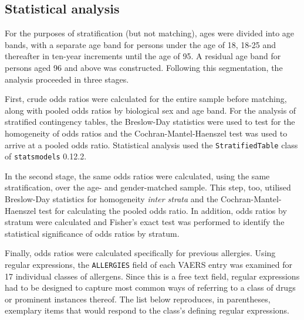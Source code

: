 \documentclass{article}
\begin{document}
\subsection{Statistical analysis}

For the purposes of stratification (but not matching), ages were divided into age bands, with a separate age band for persons under the age of 18, 18-25 and thereafter in ten-year increments until the age of 95.
A residual age band for persons aged 96 and above was constructed. Following this segmentation, the analysis proceeded in three stages.

First, crude odds ratios were calculated for the entire sample before matching, along with pooled odds ratios by biological sex and age band.
For the analysis of stratified contingency tables, the Breslow-Day statistics were used to test for the homogeneity of odds ratios and the Cochran-Mantel-Haenszel test was used to arrive at a pooled odds ratio.
Statistical analysis used the \texttt{StratifiedTable} class of \texttt{statsmodels} 0.12.2.\cite{seabold2010statsmodels}

In the second stage, the same odds ratios were calculated, using the same stratification, over the age- and gender-matched sample.
This step, too, utilised Breslow-Day statistics for homogeneity \textit{inter strata} and the Cochran-Mantel-Haenszel test for calculating the pooled odds ratio.
In addition, odds ratios by stratum were calculated and Fisher's exact test was performed to identify the statistical significance of odds ratios by stratum.

Finally, odds ratios were calculated specifically for previous allergies.
Using regular expressions, the \texttt{ALLERGIES} field of each VAERS entry was examined for 17 individual classes of allergens.
Since this is a free text field, regular expressions had to be designed to capture most common ways of referring to a class of drugs or prominent instances thereof.
The list below reproduces, in parentheses, exemplary items that would respond to the class's defining regular expressions.
\end{document}
